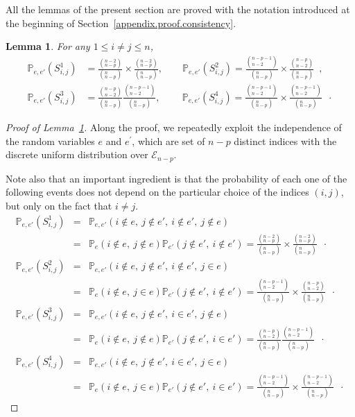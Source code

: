 \documentclass[twoside,11pt]{article}
\numberwithin{equation}{section}
\newtheorem{lem}{Lemma}[section]
\newcommand{\probi}[2]{\mathbb{P}_{#1}\left( #2 \right)}
\newcommand{\cb}[2]{(_{#2}^{#1})}
\newcommand{\1}{\mathds{1}}%
\newcommand{\Enp}{\mathcal{E}_{n-p}}
\numberwithin{equation}{section}
\theoremstyle{plain}
\begin{document}
All the lemmas of the present section are proved with the notation introduced at the beginning of Section~\ref{appendix.proof.consistency}.


\medskip

\begin{lem}\label{lem.combinatoire.prob.reechantillons}
%
For any $1\leq i\neq j\leq n$,
\begin{align*}
\probi{e,e'}{S^{1}_{i,j}}
&= \frac{\cb{n-2}{n-p}}{\cb{n}{n-p}}\times\frac{\cb{n-2}{n-p}}{\cb{n}{n-p}} ,\qquad
\probi{e,e'}{S^{2}_{i,j}}
= \frac{\cb{n-p-1}{n-2}}{\cb{n}{n-p}}\times\frac{\cb{n-p}{n-2}}{\cb{n}{n-p}} \enspace,\\
%
\probi{e,e'}{S^{3}_{i,j}}
&= \frac{\cb{n-p}{n-2}}{\cb{n}{n-p}}\frac{\cb{n-p-1}{n-2}}{\cb{n}{n-p}} , \qquad\
\probi{e,e'}{S^{4}_{i,j}}
= \frac{\cb{n-p-1}{n-2}}{\cb{n}{n-p}}\times\frac{\cb{n-p-1}{n-2}}{\cb{n}{n-p}} \enspace\cdot
\end{align*}
\end{lem}

\begin{proof}[Proof of Lemma~\ref{lem.combinatoire.prob.reechantillons}]
	Along the proof, we repeatedly exploit the independence of the random variables $e$ and $e^\prime$, which are set of $n-p$ distinct indices with the discrete uniform distribution over $\Enp$.

	Note also that an important ingredient is that the probability of each one of the following events does not depend on the particular choice of the indices $(i, j)$, but only on the fact that $i\neq j$.
\begin{eqnarray*}
\probi{e,e'}{S^{1}_{i,j}} &=& \probi{e,e'}{i \notin e,\ j \notin e',\ i \notin e',\ j \notin e} \\
&=& \probi{e}{i \notin e,\ j \notin e}\probi{e'}{j \notin e',\ i \notin e'} = \frac{\cb{n-2}{n-p}}{\cb{n}{n-p}}\times\frac{\cb{n-2}{n-p}}{\cb{n}{n-p}} \enspace\cdot \\
%
\probi{e,e'}{S^{2}_{i,j}} &=& \probi{e,e'}{i \notin e,\ j \notin e',\ i \notin e',\ j \in e} \\
&=& \probi{e}{i \notin e,\ j \in e} \probi{e'}{j \notin e',\ i \notin e'} = \frac{\cb{n-p-1}{n-2}}{\cb{n}{n-p}}\times\frac{\cb{n-p}{n-2}}{\cb{n}{n-p}}\enspace\cdot \\
%
\probi{e,e'}{S^{3}_{i,j}} &=& \probi{e,e'}{i \notin e,\ j \notin e',\ i \in e',\ j \notin e} \\
&=& \probi{e}{i \notin e,\ j \notin e} \probi{e'}{j \notin e',\ i \in e'} = \frac{\cb{n-p}{n-2}}{\cb{n}{n-p}}\frac{\cb{n-p-1}{n-2}}{\cb{n}{n-p}}\enspace\cdot \\
%
\probi{e,e'}{S^{4}_{i,j}} &=& \probi{e,e'}{i \notin e,\ j \notin e',\ i \in e',\ j \in e} \\
&=& \probi{e}{i \notin e,\ j \in e} \probi{e'}{j \notin e',\ i \in e'} = \frac{\cb{n-p-1}{n-2}}{\cb{n}{n-p}}\times\frac{\cb{n-p-1}{n-2}}{\cb{n}{n-p}}\enspace\cdot
\end{eqnarray*}

\end{proof}
\end{document}
